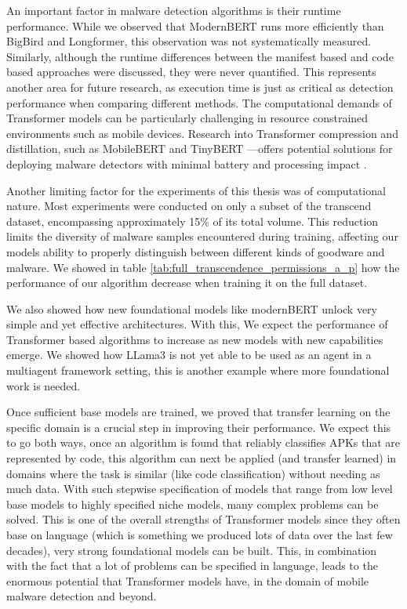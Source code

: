 An important factor in malware detection algorithms is their runtime performance.
While we observed that ModernBERT runs more efficiently than BigBird and Longformer, 
this observation was not systematically measured.
Similarly, although the runtime differences between the manifest based and code based approaches were discussed, 
they were never quantified.
This represents another area for future research, 
as execution time is just as critical as detection performance when comparing different methods.
The computational demands of Transformer models can be particularly challenging in 
resource constrained environments such as mobile devices.
Research into Transformer compression and distillation, such as MobileBERT \cite{mobilebert} 
and TinyBERT \cite{tinybert}—offers potential solutions for deploying malware detectors 
with minimal battery and processing impact \cite{mobilebert}.

Another limiting factor for the experiments of this thesis was of computational nature.
Most experiments were conducted on only a subset of the transcend dataset, 
encompassing approximately 15\% of its total volume. 
This reduction limits the diversity of malware samples encountered during training, 
affecting our models ability to properly distinguish between different kinds of goodware and malware. 
We showed in table \ref{tab:full_transcendence_permissions_a_p} how the
performance of our algorithm decrease when training it on the full dataset.

We also showed how new foundational models like modernBERT unlock very simple and yet 
effective architectures. 
With this, We expect the performance of Transformer based algorithms to increase as 
new models with new capabilities emerge. 
We showed how LLama3 \cite{llama3modelcard} is not yet able to be used as an agent 
in a multiagent framework setting, this is another example where more foundational work is needed.

Once sufficient base models are trained, we proved that transfer learning on the specific domain 
is a crucial step in improving their performance.
We expect this to go both ways, once an algorithm is found that reliably classifies APKs that are 
represented by code, this algorithm can next be applied (and transfer learned) in domains
where the task is similar (like code classification) without needing as much data.
With such stepwise specification of models that range from low level base models to
highly specified niche models, many complex problems can be solved.
This is one of the overall strengths of Transformer models since they often base on language (which
is something we produced lots of data over the last few decades), very strong foundational models
can be built. This, in combination with the fact that a lot of problems can be specified in language,
leads to the enormous potential that Transformer models have, in the domain of mobile malware detection
and beyond.

